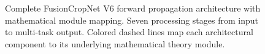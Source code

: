 \begin{figure}[ht]
\caption{Complete FusionCropNet V6 forward propagation architecture with mathematical module mapping. Seven processing stages from input to multi-task output. Colored dashed lines map each architectural component to its underlying mathematical theory module.}
\label{fig:v6-forward}
\end{figure}


